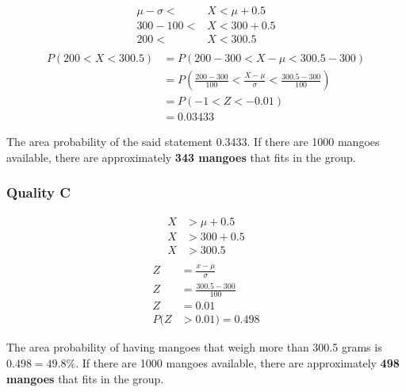 \documentclass[
  11pt, %
]{assignment}
\begin{document}
\begin{align*}
  \mu - \sigma < & X < \mu + 0.5 \\
  300 - 100    < & X < 300 + 0.5 \\
  200          < & X < 300.5     \\
\end{align*}
\begin{align*}
  P(200 < X < 300.5) & = P (200 - 300 < X - \mu < 300.5 - 300)                                    \\
                     & = P (\frac{200-300}{100} < \frac{X-\mu}{\sigma} < \frac{300.5 - 300}{100}) \\
                     & = P (-1 < Z < -0.01)                                                       \\
                     & = 0.03433
\end{align*}

The area probability of the said statement 0.3433. If there are 1000 mangoes available, there are approximately \textbf{343 mangoes} that fits in the group.

\subsubsection*{Quality C}
\begin{align*}
  X & > \mu + 0.5 \\
  X & > 300 + 0.5 \\
  X & > 300.5     \\
\end{align*}
\begin{align*}
  Z    & = \frac{x - \mu}{\sigma}  \\
  Z    & = \frac{300.5 - 300}{100} \\
  Z    & = 0.01                    \\
  P( Z & > 0.01)  = 0.498
\end{align*}

The area probability of having mangoes that weigh more than 300.5 grams is \( 0.498 = 49.8\% \). If there are 1000 mangoes available, there are approximately \textbf{498 mangoes} that fits in the group.
\end{document}
